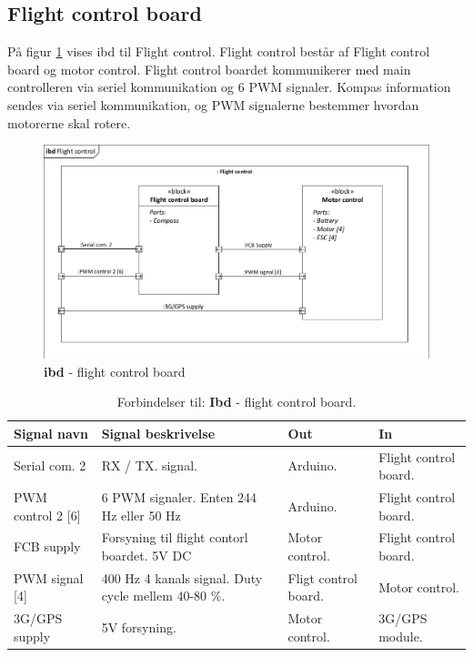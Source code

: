 \subsection{Flight control board}

På figur \ref{fig:ibd_flightcontrolboard} vises ibd til Flight control. Flight control består af Flight control board og motor control. Flight control boardet kommunikerer med main controlleren via seriel kommunikation og 6 PWM signaler. Kompas information sendes via seriel kommunikation, og PWM signalerne bestemmer hvordan motorerne skal rotere. 

\begin{figure}[H]
\centering
\includegraphics[width=1\textwidth]{Billeder/IBD/ibd5_flightcontrolboard.pdf}
\vspace{-0.5cm}
\caption{\textbf{ibd} - flight control board}
\label{fig:ibd_flightcontrolboard}
\end{figure}

\vspace{0.5cm}

\begin{table}[H]
	\centering
		\begin{tabular}{|p{3.2 cm}|p{5.2 cm}|p{2.4 cm}|p{2.4 cm}|} 
		\hline
			\textbf{Signal navn} 	& \textbf{Signal beskrivelse}		& \textbf{Out} 				& \textbf{In}     \\ \hline
			Serial com. 2 & RX / TX. signal. & Arduino. & Flight control board.			    \\ \hline
			PWM control 2 [6] & 6 PWM signaler. \newline Enten 244 Hz eller 50 Hz & Arduino. & Flight control board.				\\ \hline
			FCB supply &  Forsyning til flight contorl \newline boardet. 5V DC & Motor control. & Flight control board.	\\ \hline
			PWM signal [4] & 400 Hz 4 kanals signal. \newline Duty cycle mellem 40-80 $\%$. & Fligt control board. & Motor control.   \\ \hline 
			3G/GPS supply & 5V forsyning. & Motor control. & 3G/GPS \newline module.  \\ \hline 
		\end{tabular}
	\caption{Forbindelser til: \textbf{Ibd} - flight control board. }
	\label{tab:ibd_Flight_control_board}
\end{table}



